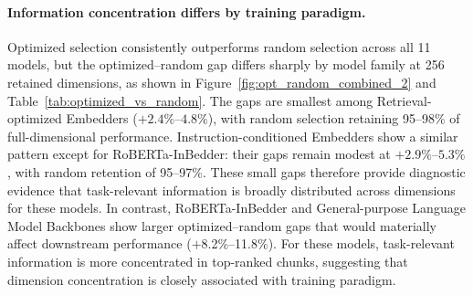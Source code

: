 \documentclass[11pt]{article}
\begin{document}
\paragraph{Information concentration differs by training paradigm.}
Optimized selection consistently outperforms random selection across all 11 models, but the optimized--random gap differs sharply by model family at 256 retained dimensions, as shown in Figure~\ref{fig:opt_random_combined_2} and Table~\ref{tab:optimized_vs_random}. The gaps are smallest among Retrieval-optimized Embedders ($+2.4\%$--$4.8\%$), with random selection retaining 95--98\% of full-dimensional performance. Instruction-conditioned Embedders show a similar pattern except for RoBERTa-InBedder: their gaps remain modest at $+2.9\%$--$5.3\%$, with random retention of 95--97\%. These small gaps therefore provide diagnostic evidence that task-relevant information is broadly distributed across dimensions for these models. In contrast, RoBERTa-InBedder and General-purpose Language Model Backbones show larger optimized--random gaps that would materially affect downstream performance ($+$8.2\%--11.8\%). For these models, task-relevant information is more concentrated in top-ranked chunks, suggesting that dimension concentration is closely associated with training paradigm. 

\begin{table}[t]
    \centering
    \caption{Mean retention (\%) by task category for GTE-Large at 256 retained dimensions. Random, Optimized, and Anti-optimized columns report retention ratios for the three strategies relative to the full-dimensional baseline, averaged over tasks within each category. Gap is Optimized--Random gap.}
    \label{tab:category_summary}
\end{table}
\end{document}
